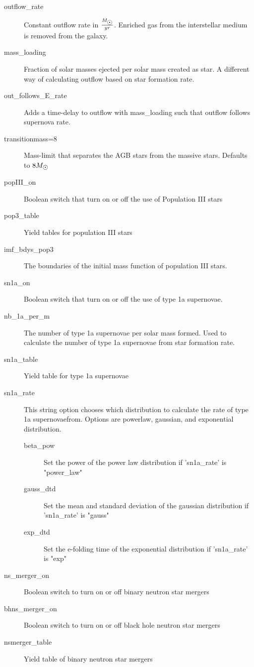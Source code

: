 \begin{description}
\item[outflow\_rate]  Constant outflow rate in $\frac{\msol}{yr}$. Enriched gas from the interstellar medium is removed from the galaxy.
\item[mass\_loading] Fraction of solar masses ejected per solar mass created as star. A different way of calculating outflow based on star formation rate.
\item[out\_follows\_E\_rate] Adds a time-delay to outflow with mass\_loading such that outflow follows supernova rate.
\item[transitionmass=8]
  Mass-limit that separates the AGB stars from the massive stars.
  Defaults to $8\msol$
\item[popIII\_on] Boolean switch that turn on or off the use of Population III stars
\item[pop3\_table] Yield tables for population III stars
\item[imf\_bdys\_pop3] The boundaries of the initial mass function of population III stars.
\item[sn1a\_on] Boolean switch that turn on or off the use of type 1a supernovae.
\item[nb\_1a\_per\_m] The number of type 1a supernovae per solar mass formed.
  Used to calculate the number of type 1a supernovae from star formation rate.
\item[sn1a\_table] Yield table for type 1a supernovae
\item[sn1a\_rate] This string option chooses which distribution to calculate the rate of type 1a supernovaefrom.
  Options are powerlaw, gaussian, and exponential distribution.
  \begin{description}
  \item[beta\_pow] Set the power of the power law distribution if 'sn1a\_rate' is "power\_law" 
  \item[gauss\_dtd] Set the mean and standard deviation of the gaussian distribution if 'sn1a\_rate' is "gauss" 
  \item[exp\_dtd] Set the e-folding time of the exponential distribution if 'sn1a\_rate' is "exp"
  \end{description}
\item[ns\_merger\_on] Boolean switch to turn on or off binary neutron star mergers
\item[bhns\_merger\_on] Boolean switch to turn on or off black hole neutron star mergers
\item[nsmerger\_table] Yield table of binary neutron star mergers

\end{description}
